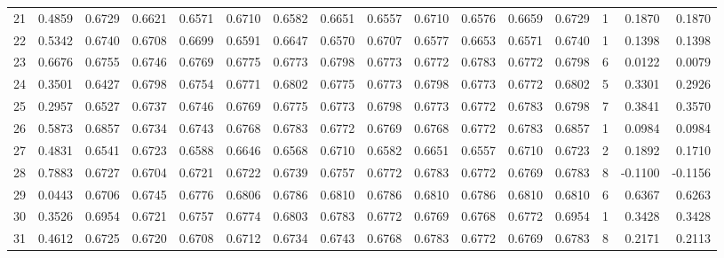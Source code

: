 \begin{tabular}{lrrrrrrrrrrrrrrr}
21  &      0.4859 &  0.6729 &  0.6621 &  0.6571 &  0.6710 &  0.6582 &  0.6651 &  0.6557 &  0.6710 &  0.6576 &   0.6659 &     0.6729 &      1 &                    0.1870 &                     0.1870 \\
22  &      0.5342 &  0.6740 &  0.6708 &  0.6699 &  0.6591 &  0.6647 &  0.6570 &  0.6707 &  0.6577 &  0.6653 &   0.6571 &     0.6740 &      1 &                    0.1398 &                     0.1398 \\
23  &      0.6676 &  0.6755 &  0.6746 &  0.6769 &  0.6775 &  0.6773 &  0.6798 &  0.6773 &  0.6772 &  0.6783 &   0.6772 &     0.6798 &      6 &                    0.0122 &                     0.0079 \\
24  &      0.3501 &  0.6427 &  0.6798 &  0.6754 &  0.6771 &  0.6802 &  0.6775 &  0.6773 &  0.6798 &  0.6773 &   0.6772 &     0.6802 &      5 &                    0.3301 &                     0.2926 \\
25  &      0.2957 &  0.6527 &  0.6737 &  0.6746 &  0.6769 &  0.6775 &  0.6773 &  0.6798 &  0.6773 &  0.6772 &   0.6783 &     0.6798 &      7 &                    0.3841 &                     0.3570 \\
26  &      0.5873 &  0.6857 &  0.6734 &  0.6743 &  0.6768 &  0.6783 &  0.6772 &  0.6769 &  0.6768 &  0.6772 &   0.6783 &     0.6857 &      1 &                    0.0984 &                     0.0984 \\
27  &      0.4831 &  0.6541 &  0.6723 &  0.6588 &  0.6646 &  0.6568 &  0.6710 &  0.6582 &  0.6651 &  0.6557 &   0.6710 &     0.6723 &      2 &                    0.1892 &                     0.1710 \\
28  &      0.7883 &  0.6727 &  0.6704 &  0.6721 &  0.6722 &  0.6739 &  0.6757 &  0.6772 &  0.6783 &  0.6772 &   0.6769 &     0.6783 &      8 &                   -0.1100 &                    -0.1156 \\
29  &      0.0443 &  0.6706 &  0.6745 &  0.6776 &  0.6806 &  0.6786 &  0.6810 &  0.6786 &  0.6810 &  0.6786 &   0.6810 &     0.6810 &      6 &                    0.6367 &                     0.6263 \\
30  &      0.3526 &  0.6954 &  0.6721 &  0.6757 &  0.6774 &  0.6803 &  0.6783 &  0.6772 &  0.6769 &  0.6768 &   0.6772 &     0.6954 &      1 &                    0.3428 &                     0.3428 \\
31  &      0.4612 &  0.6725 &  0.6720 &  0.6708 &  0.6712 &  0.6734 &  0.6743 &  0.6768 &  0.6783 &  0.6772 &   0.6769 &     0.6783 &      8 &                    0.2171 &                     0.2113 \\

\end{tabular}
